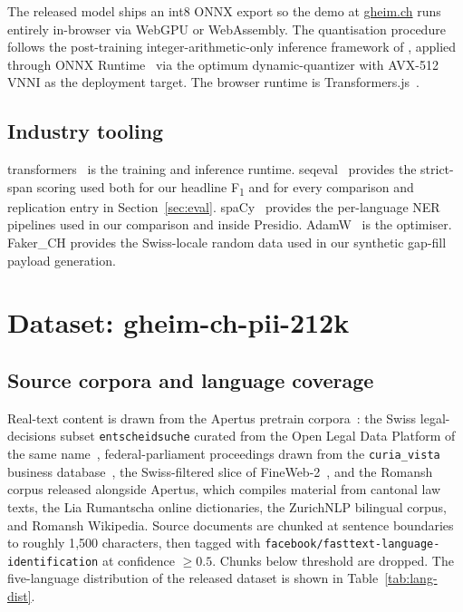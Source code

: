 \documentclass[sigconf,nonacm]{acmart}
\begin{document}
The released model ships an int8 ONNX export so the demo at
\href{https://gheim.ch}{gheim.ch} runs entirely in-browser via
WebGPU or WebAssembly. The quantisation procedure follows the
post-training integer-arithmetic-only inference framework of
\citet{jacob2018quantization}, applied through ONNX
Runtime~\cite{onnxruntime} via the \textsf{optimum} dynamic-quantizer
with AVX-512 VNNI as the deployment target. The browser runtime is
\textsf{Transformers.js}~\cite{transformersjs}.

\subsection{Industry tooling}

\textsf{transformers}~\cite{wolf2020transformers} is the training
and inference runtime. \textsf{seqeval}~\cite{nakayama2018seqeval}
provides the strict-span scoring used both for our headline
F\textsubscript{1} and for every comparison and replication entry
in Section~\ref{sec:eval}. \textsf{spaCy}~\cite{honnibal2020spacy}
provides the per-language NER pipelines used in our comparison
and inside Presidio. AdamW~\cite{loshchilov2019decoupled} is the
optimiser. Faker\_CH provides the Swiss-locale random data used in
our synthetic gap-fill payload generation.

\section{Dataset: gheim-ch-pii-212k}
\label{sec:dataset}

\subsection{Source corpora and language coverage}

Real-text content is drawn from the Apertus pretrain
corpora~\cite{apertus2025}: the Swiss legal-decisions
subset \texttt{entscheidsuche} curated from the Open Legal Data Platform
of the same name~\cite{entscheidsuche2025}, federal-parliament
proceedings drawn from the \texttt{curia\_vista} business
database~\cite{curiavista2024}, the Swiss-filtered slice of
FineWeb-2~\cite{penedo2025fineweb2}, and the Romansh corpus released
alongside Apertus, which compiles material from cantonal law texts,
the Lia Rumantscha online dictionaries, the ZurichNLP bilingual
corpus, and Romansh Wikipedia. Source documents are chunked at
sentence boundaries to roughly 1{,}500 characters, then tagged with
\texttt{facebook/fasttext-language-identifica\-tion} at confidence
$\geq 0.5$. Chunks below threshold are dropped.
The five-language distribution of the released dataset is shown in
Table~\ref{tab:lang-dist}.
\end{document}
